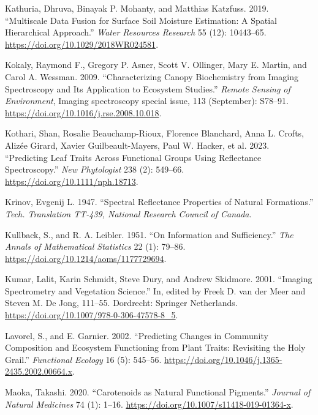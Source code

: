 \documentclass[
  letterpaper,
  DIV=11,
  numbers=noendperiod]{scrartcl}
\newlength{\cslhangindent}
\newlength{\cslentryspacingunit} %
\newenvironment{CSLReferences}[2] %
 {%
  \setlength{\parindent}{0pt}
  \ifodd #1
  \let\oldpar\par
  \def\par{\hangindent=\cslhangindent\oldpar}
  \fi
  \setlength{\parskip}{#2\cslentryspacingunit}
 }%
 {}
\begin{document}
\begin{CSLReferences}{1}{0}
\leavevmode{}%
Kathuria, Dhruva, Binayak P. Mohanty, and Matthias Katzfuss. 2019.
{``Multiscale Data Fusion for Surface Soil Moisture Estimation: A
Spatial Hierarchical Approach.''} \emph{Water Resources Research} 55
(12): 10443--65. \url{https://doi.org/10.1029/2018WR024581}.

\leavevmode{}%
Kokaly, Raymond F., Gregory P. Asner, Scott V. Ollinger, Mary E. Martin,
and Carol A. Wessman. 2009. {``Characterizing Canopy Biochemistry from
Imaging Spectroscopy and Its Application to Ecosystem Studies.''}
\emph{Remote Sensing of Environment}, Imaging spectroscopy special
issue, 113 (September): S78--91.
\url{https://doi.org/10.1016/j.rse.2008.10.018}.

\leavevmode{}%
Kothari, Shan, Rosalie Beauchamp-Rioux, Florence Blanchard, Anna L.
Crofts, Alizée Girard, Xavier Guilbeault-Mayers, Paul W. Hacker, et al.
2023. {``Predicting Leaf Traits Across Functional Groups Using
Reflectance Spectroscopy.''} \emph{New Phytologist} 238 (2): 549--66.
\url{https://doi.org/10.1111/nph.18713}.

\leavevmode{}%
Krinov, Evgenij L. 1947. {``Spectral Reflectance Properties of Natural
Formations.''} \emph{Tech. Translation TT-439, National Research Council
of Canada}.

\leavevmode{}%
Kullback, S., and R. A. Leibler. 1951. {``On Information and
Sufficiency.''} \emph{The Annals of Mathematical Statistics} 22 (1):
79--86. \url{https://doi.org/10.1214/aoms/1177729694}.

\leavevmode{}%
Kumar, Lalit, Karin Schmidt, Steve Dury, and Andrew Skidmore. 2001.
{``Imaging Spectrometry and Vegetation Science.''} In, edited by Freek
D. van der Meer and Steven M. De Jong, 111--55. Dordrecht: Springer
Netherlands. \url{https://doi.org/10.1007/978-0-306-47578-8_5}.

\leavevmode{}%
Lavorel, S., and E. Garnier. 2002. {``Predicting Changes in Community
Composition and Ecosystem Functioning from Plant Traits: Revisiting the
Holy Grail.''} \emph{Functional Ecology} 16 (5): 545--56.
\url{https://doi.org/10.1046/j.1365-2435.2002.00664.x}.

\leavevmode{}%
Maoka, Takashi. 2020. {``Carotenoids as Natural Functional Pigments.''}
\emph{Journal of Natural Medicines} 74 (1): 1--16.
\url{https://doi.org/10.1007/s11418-019-01364-x}.


\end{CSLReferences}
\end{document}
